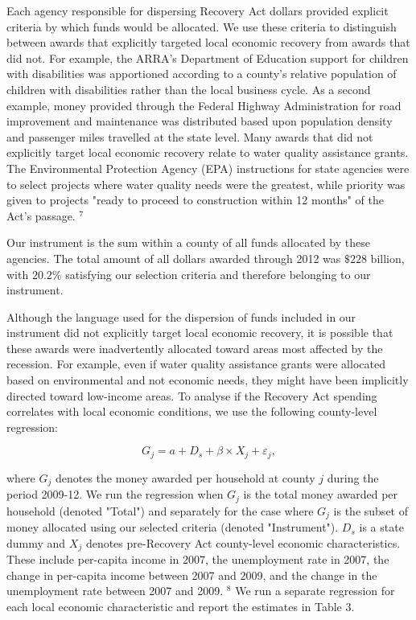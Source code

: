 \documentclass[10pt]{article}
\begin{document}
Each agency responsible for dispersing Recovery Act dollars provided explicit criteria by which funds would be allocated. We use these criteria to distinguish between awards that explicitly targeted local economic recovery from awards that did not. For example, the ARRA's Department of Education support for children with disabilities was apportioned according to a county's relative population of children with disabilities rather than the local business cycle. As a second example, money provided through the Federal Highway Administration for road improvement and maintenance was distributed based upon population density and passenger miles travelled at the state level. Many awards that did not explicitly target local economic recovery relate to water quality assistance grants. The Environmental Protection Agency (EPA) instructions for state agencies were to select projects where water quality needs were the greatest, while priority was given to projects "ready to proceed to construction within 12 months" of the Act's passage. ${ }^{7}$

Our instrument is the sum within a county of all funds allocated by these agencies. The total amount of all dollars awarded through 2012 was $\$ 228$ billion, with $20.2 \%$ satisfying our selection criteria and therefore belonging to our instrument.

Although the language used for the dispersion of funds included in our instrument did not explicitly target local economic recovery, it is possible that these awards were inadvertently allocated toward areas most affected by the recession. For example, even if water quality assistance grants were allocated based on environmental and not economic needs, they might have been implicitly directed toward low-income areas. To analyse if the Recovery Act spending correlates with local economic conditions, we use the following county-level regression:


\begin{equation*}
G_{j}=a+D_{s}+\beta \times X_{j}+\varepsilon_{j}, \tag{2.1}
\end{equation*}


where $G_{j}$ denotes the money awarded per household at county $j$ during the period 2009-12. We run the regression when $G_{j}$ is the total money awarded per household (denoted "Total") and separately for the case where $G_{j}$ is the subset of money allocated using our selected criteria (denoted "Instrument"). $D_{s}$ is a state dummy and $X_{j}$ denotes pre-Recovery Act county-level economic characteristics. These include per-capita income in 2007, the unemployment rate in 2007, the change in per-capita income between 2007 and 2009, and the change in the unemployment rate between 2007 and 2009. ${ }^{8}$ We run a separate regression for each local economic characteristic and report the estimates in Table 3.
\end{document}
